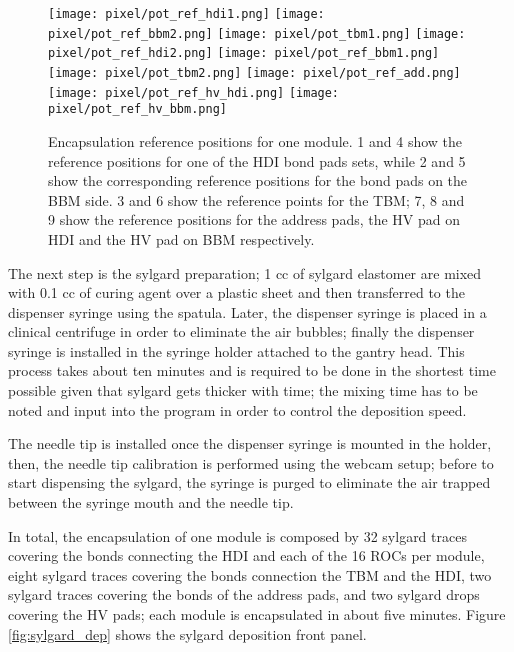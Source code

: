 \begin{figure}[h]
\begin{center}
  \texttt{[image: pixel/pot\_ref\_hdi1.png]}
  \texttt{[image: pixel/pot\_ref\_bbm2.png]}
  \texttt{[image: pixel/pot\_tbm1.png]}
  \texttt{[image: pixel/pot\_ref\_hdi2.png]}
  \texttt{[image: pixel/pot\_ref\_bbm1.png]}
  \texttt{[image: pixel/pot\_tbm2.png]}
  \texttt{[image: pixel/pot\_ref\_add.png]}
  \texttt{[image: pixel/pot\_ref\_hv\_hdi.png]}
  \texttt{[image: pixel/pot\_ref\_hv\_bbm.png]}
 \caption[Encapsulation reference positions.]{Encapsulation reference positions for one module. 1 and 4 show the reference positions for one of the HDI bond pads sets, while 2 and 5 show the corresponding reference positions for the bond pads on the BBM side. 3 and 6 show the reference points for the TBM; 7, 8 and 9 show the reference positions for the address pads, the HV pad on HDI and the HV pad on BBM respectively.}\label{fig:potting_references}
\end{center}
\end{figure}

The next step is the sylgard preparation; 1 cc of sylgard elastomer are mixed with 0.1 cc of curing agent over a plastic sheet and then transferred to the dispenser syringe using the spatula. Later, the dispenser syringe is placed in a clinical centrifuge in order to eliminate the air bubbles; finally the dispenser syringe is installed in the syringe holder attached to the gantry head. This process takes about ten minutes and is required to be done in the shortest time possible given that sylgard gets thicker with time; the mixing time has to be noted and input into the program in order to control the deposition speed.

The needle tip is installed once the dispenser syringe is mounted in the holder, then, the needle tip calibration is performed using the webcam setup; before to start dispensing the sylgard, the syringe is purged to eliminate the air trapped between the syringe mouth and the needle tip.

In total, the encapsulation of one module is composed by 32 sylgard traces covering the bonds connecting the HDI and each of the 16 ROCs per module, eight sylgard traces covering the bonds connection the TBM and the HDI, two sylgard traces covering the bonds of the address pads, and two sylgard drops covering the HV pads; each module is encapsulated in about five minutes. Figure \ref{fig:sylgard_dep} shows the sylgard deposition front panel. 

